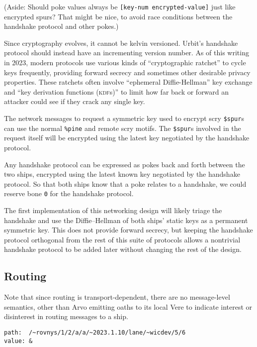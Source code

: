 \documentclass[twoside]{article}
\begin{document}
(Aside: Should poke values always be \lstinline[style=inlinecode]{[key-num encrypted-value]} just like encrypted spurs? That might be nice, to avoid race conditions between the handshake protocol and other pokes.)

Since cryptography evolves, it cannot be kelvin versioned. Urbit's handshake protocol should instead have an incrementing version number. As of this writing in 2023, modern protocols use various kinds of ``cryptographic ratchet'' to cycle keys frequently, providing forward secrecy and sometimes other desirable privacy properties. These ratchets often involve ``ephemeral Diffie-Hellman'' key exchange and ``key derivation functions (\textsc{kdf}s)'' to limit how far back or forward an attacker could see if they crack any single key.

The network messages to request a symmetric key used to encrypt scry \lstinline[style=inlinecode]{$spur}s can use the normal \lstinline[style=inlinecode]{%pine} and remote scry motifs. The \lstinline[style=inlinecode]{$spur}s involved in the request itself will be encrypted using the latest key negotiated by the handshake protocol.

Any handshake protocol can be expressed as pokes back and forth between the two ships, encrypted using the latest known key negotiated by the handshake protocol. So that both ships know that a poke relates to a handshake, we could reserve bone \lstinline[style=inlinecode]{0} for the handshake protocol.

The first implementation of this networking design will likely triage the handshake and use the Diffie–Hellman of both ships' static keys as a permanent symmetric key. This does not provide forward secrecy, but keeping the handshake protocol orthogonal from the rest of this suite of protocols allows a nontrivial handshake protocol to be added later without changing the rest of the design.

\subsection{Routing}

Note that since routing is transport-dependent, there are no message-level semantics, other than Arvo emitting oaths to its local Vere to indicate interest or disinterest in routing messages to a ship.

\pagebreak{}

\begin{lstlisting}[style=listingcode]
path:  /~rovnys/1/2/a/a/~2023.1.10/lane/~wicdev/5/6
value: &
\end{lstlisting}
\end{document}
